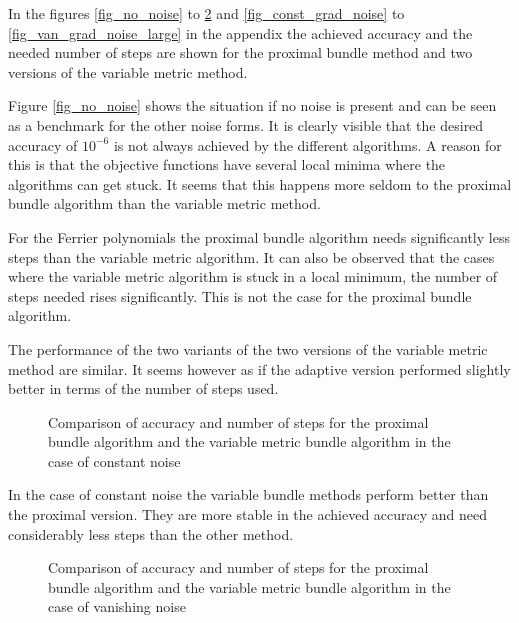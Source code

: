 In the figures \ref{fig_no_noise} to \ref{fig_van_noise} and \ref{fig_const_grad_noise} to \ref{fig_van_grad_noise_large} in the appendix the achieved accuracy and the needed number of steps are shown for the proximal bundle method and two versions of the variable metric method.

Figure \ref{fig_no_noise} shows the situation if no noise is present and can be seen as a benchmark for the other noise forms.
It is clearly visible that the desired accuracy of \(10^{-6}\) is not always achieved by the different algorithms. A reason for this is that the objective functions have several local minima where the algorithms can get stuck. It seems that this happens more seldom to the proximal bundle algorithm than the variable metric method.

For the Ferrier polynomials the proximal bundle algorithm needs significantly less steps than the variable metric algorithm. It can also be observed that the cases where the variable metric algorithm is stuck in a local minimum, the number of steps needed rises significantly. This is not the case for the proximal bundle algorithm.

The performance of the two variants of the two versions of the variable metric method are similar. It seems however as if the adaptive version performed slightly better in terms of the number of steps used.


\begin{figure}[ht]
	\begin{subfigure}{0.49\textwidth}
	\end{subfigure}
	\begin{subfigure}{0.49\textwidth}
	\end{subfigure}
	\caption{Comparison of accuracy and number of steps for the proximal bundle algorithm and the variable metric bundle algorithm in the case of constant noise}%
	\label{fig_const_noise}%
\end{figure}

In the case of constant noise the variable bundle methods perform better than the proximal version. They are more stable in the achieved accuracy and need considerably less steps than the other method.

\begin{figure}[ht]
	\begin{subfigure}{0.49\textwidth}
	\end{subfigure}
	\begin{subfigure}{0.49\textwidth}
	\end{subfigure}
	\caption{Comparison of accuracy and number of steps for the proximal bundle algorithm and the variable metric bundle algorithm in the case of vanishing noise}%
	\label{fig_van_noise}%
\end{figure}

